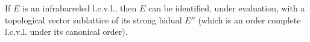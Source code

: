 If $E$ is an infrabarreled l.c.v.l., then $E$ can be identified, under evaluation, with a topological vector sublattice of its strong bidual $E''$ (which is an order complete l.c.v.l. under its canonical order).
